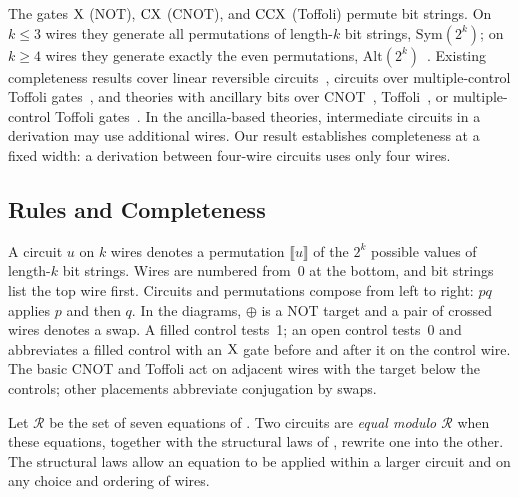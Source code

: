 \documentclass[acmsmall,screen,nonacm]{acmart}
\begin{document}
The gates $\mathrm{X}$ (NOT), $\mathrm{CX}$ (CNOT), and $\mathrm{CCX}$ (Toffoli) permute bit
strings. On $k\le3$ wires they generate all permutations of length-$k$ bit strings, $\mathrm{Sym}(2^k)$; on
$k\ge4$ wires they generate exactly the even permutations,
$\mathrm{Alt}(2^k)$~\cite{shende2003synthesis}.
Existing completeness results cover linear reversible
circuits~\cite{lafont2003boolean,sakashita2013cnot}, circuits over
multiple-control Toffoli gates~\cite{feng2026complete}, and theories
with ancillary bits over CNOT~\cite{cockett2018cnot},
Toffoli~\cite{cockett2019tof}, or multiple-control
Toffoli gates~\cite{iwama2002transformation}.
In the ancilla-based theories, intermediate circuits in a derivation
may use additional wires. Our result establishes completeness at a
fixed width: a derivation between four-wire circuits uses only four
wires.

\subsection{Rules and Completeness}

A circuit $u$ on $k$ wires denotes a permutation
$\llbracket u\rrbracket$ of the $2^k$ possible values of length-$k$ bit strings. Wires are numbered
from~0 at the bottom, and bit strings list the top wire first.
Circuits and permutations compose from left to right: $pq$ applies
$p$ and then $q$.
In the diagrams, $\oplus$ is a NOT target and a pair of crossed wires denotes
a swap. A filled control tests~1; an open control tests~0 and abbreviates
a filled control with an $\mathrm{X}$ gate before and after it on the control wire.
The basic CNOT and Toffoli act on adjacent wires with the target
below the controls; other placements abbreviate conjugation by swaps.

Let $\mathcal{R}$ be the set of seven equations of .
Two circuits are \emph{equal modulo $\mathcal{R}$} when these
equations, together with the structural
laws of , rewrite one into the other.
The structural laws allow an equation to be applied within a larger
circuit and on any choice and ordering of wires.
\end{document}
